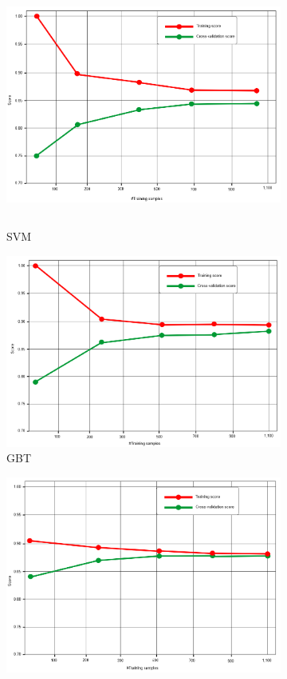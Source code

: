 \begin{figure}
	\centering
	\begin{subfigure}{0.48\linewidth}
		\centering
		\includegraphics[width=0.9\linewidth,height=80mm]{images/SVM.png}
		\caption{SVM}
		\label{fig9a}
	\end{subfigure}
	\begin{subfigure}{0.48\linewidth}
		\centering
		\includegraphics[width=0.9\linewidth]{images/GBT.png}
		\caption{GBT}
		\label{fig9b}
	\end{subfigure}
	\begin{subfigure}{0.48\linewidth}
		\centering
		\includegraphics[width=0.9\linewidth]{images/RF.png}

\end{subfigure}
\end{figure}
